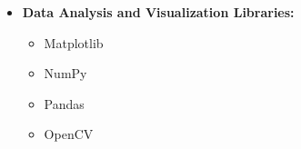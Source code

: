 \documentclass[12pt]{article}
\begin{document}
\begin{itemize}
\begin{itemize}
		\item \textbf{Data Analysis and Visualization Libraries:}
		\begin{multicols}{4}
			\begin{itemize}
				\item Matplotlib
				\item NumPy
				\item Pandas
				\item OpenCV
			\end{itemize}
		\end{multicols}
	

\end{itemize}
\end{itemize}
\end{document}
